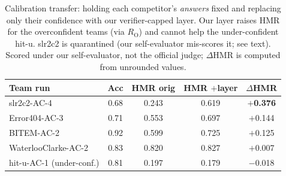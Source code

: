 \documentclass[sigconf,nonacm]{acmart}
\newcommand{\HMR}{\textsc{HMR}}
\newcommand{\RO}{R_{\mathrm{O}}}
\begin{document}
\begin{table}[t]
\centering\small
\caption{Calibration transfer: holding each competitor's \emph{answers} fixed and replacing
only their confidence with our verifier-capped layer. Our layer raises \HMR{} for the
overconfident teams (via $\RO$) and cannot help the under-confident hit-u. slr2c2 is quarantined
(our self-evaluator mis-scores it; see text). Scored under our self-evaluator, not the
official judge; $\Delta$\HMR{} is computed from unrounded values.}
\label{tab:transfer}
\begin{tabular}{lcccc}
\toprule
Team run & Acc & \HMR{} orig & \HMR{} $+$layer & $\Delta$\HMR \\
\midrule
slr2c2-AC-4         & 0.68 & 0.243 & 0.619 & \textbf{$+$0.376} \\
Error404-AC-3       & 0.71 & 0.553 & 0.697 & $+$0.144 \\
BITEM-AC-2          & 0.92 & 0.599 & 0.725 & $+$0.125 \\
WaterlooClarke-AC-2 & 0.83 & 0.820 & 0.827 & $+$0.007 \\
hit-u-AC-1 (under-conf.)& 0.81 & 0.197 & 0.179 & $-$0.018 \\
\bottomrule
\end{tabular}
\end{table}
\end{document}
